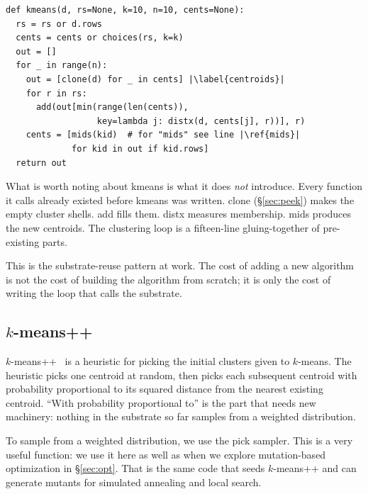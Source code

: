 \documentclass[AMA,STIX2COL]{WileyNJDv5}
\begin{document}
\begin{lstlisting}
def kmeans(d, rs=None, k=10, n=10, cents=None):
  rs = rs or d.rows
  cents = cents or choices(rs, k=k)
  out = []
  for _ in range(n):
    out = [clone(d) for _ in cents] |\label{centroids}|
    for r in rs:
      add(out[min(range(len(cents)),
                  key=lambda j: distx(d, cents[j], r))], r)
    cents = [mids(kid)  # for "mids" see line |\ref{mids}|
             for kid in out if kid.rows]
  return out
\end{lstlisting}
What is worth noting about \textsf{kmeans} is what it does
\emph{not} introduce. Every function it calls already existed
before \textsf{kmeans} was written. \textsf{clone}
(\S\ref{sec:peek}) makes the empty cluster shells. \textsf{add}
fills them. \textsf{distx} measures membership. \textsf{mids}
produces the new centroids. The clustering loop is a
fifteen-line gluing-together of pre-existing parts.

This is the substrate-reuse pattern at work. The cost of
adding a new algorithm is not the cost of building the
algorithm from scratch; it is only the cost of writing the
loop that calls the substrate.

\subsection{$k$-means++}

$k$-means++~\cite{arthur2007kmeanspp} is a heuristic for picking
the initial clusters given to $k$-means. The heuristic picks one
centroid at random, then picks each subsequent centroid with
probability proportional to its squared distance from the
nearest existing centroid. ``With probability proportional to''
is the part that needs new machinery: nothing in the substrate
so far samples from a weighted distribution.

To sample from a weighted distribution, we use the  
\textsf{pick} sampler. This is a very useful function: we use 
it here as well as when we explore
mutation-based optimization in \S\ref{sec:opt}.
That is  the same code that seeds $k$-means++ and can 
generate mutants for simulated annealing and local search. 
\end{document}
